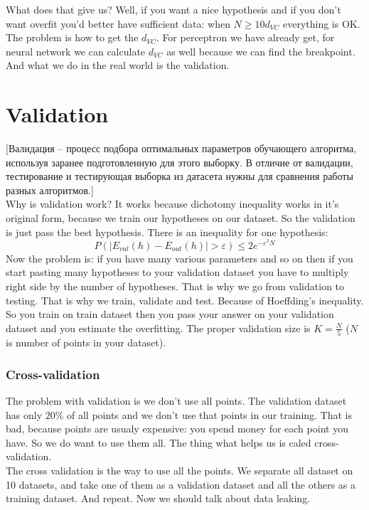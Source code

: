 What does that give us? Well, if you want a nice hypothesis and if you don't want overfit you'd better have sufficient data: when $N\ge 10d_{VC}$ everything is OK. The problem is how to get the $d_{VC}$. For perceptron we have already get, for neural network we can calculate $d_{VC}$ as well because we can find the breakpoint. And what we do in the real world is the validation.

\section{Validation}

[Валидация -- процесс подбора оптимальных параметров обучающего алгоритма, используя заранее подготовленную для этого выборку. В отличие от валидации, тестирование и тестирующая выборка из датасета нужны для сравнения работы разных алгоритмов.]\\
Why is validation work? It works because dichotomy inequality works in it's original form, because we train our hypotheses on our dataset. So the validation is just pass the best hypothesis. There is an inequality for one hypothesis:
$$P(|E_{val}(h)-E_{out}(h)|>\varepsilon)\le2e^{-\varepsilon^2N}$$
Now the problem is: if you have many various parameters and so on then if you start pasting many hypotheses to your validation dataset you have to multiply right side by the number of hypotheses. That is why we go from validation to testing. That is why we train, validate and test. Because of Hoeffding's inequality. So you train on train dataset then you pass your answer on your validation dataset and you estimate the overfitting. The proper validation size is $K=\frac{N}{5}$ ($N$ is number of points in your dataset).

\subsubsection*{Cross-validation}

The problem with validation is we don't use all points. The validation dataset has only $20\%$ of all points and we don't use that points in our training. That is bad, because points are usualy expensive: you spend money for each point you have. So we do want to use them all. The thing what helps us is caled cross-validation.\\
The cross validation is the way to use all the points. We separate all dataset on 10 datasets, and take one of them as a validation dataset and all the others as a training dataset. And repeat. Now we should talk about data leaking.

